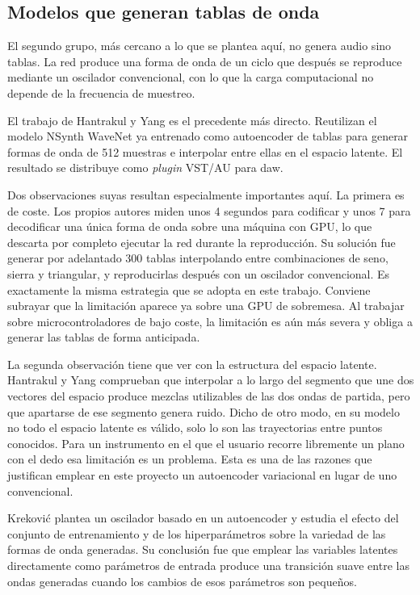 \subsection{Modelos que generan tablas de onda}

El segundo grupo, más cercano a lo que se plantea aquí, no genera audio sino
tablas. La red produce una forma de onda de un ciclo que después se reproduce
mediante un oscilador convencional, con lo que la carga computacional no 
depende de la frecuencia de muestreo.

El trabajo de Hantrakul y Yang \cite{Hantrakul2018} es el precedente más
directo. Reutilizan el modelo NSynth WaveNet ya entrenado como autoencoder de
tablas para generar formas de onda de 512 muestras e interpolar entre ellas en
el espacio latente. El resultado se distribuye como \emph{plugin} VST/AU para
\gls{daw}.

Dos observaciones suyas resultan especialmente importantes aquí. La primera es
de coste. Los propios autores miden unos 4 segundos para codificar y unos 7 para
decodificar una única forma de onda sobre una máquina con GPU, lo que descarta
por completo ejecutar la red durante la reproducción. Su solución fue generar
por adelantado 300 tablas interpolando entre combinaciones de seno, sierra y
triangular, y reproducirlas después con un oscilador convencional. Es exactamente
la misma estrategia que se adopta en este trabajo. Conviene subrayar que 
la limitación aparece ya sobre una GPU de sobremesa. Al trabajar sobre 
microcontroladores de bajo coste, la limitación es aún más severa y
obliga a generar las tablas de forma anticipada.

La segunda observación tiene que ver con la estructura del espacio latente.
Hantrakul y Yang comprueban que interpolar a lo largo del segmento que une dos
vectores del espacio produce mezclas utilizables de las dos ondas de partida,
pero que apartarse de ese segmento genera ruido. Dicho de otro modo, en su
modelo no todo el espacio latente es válido, solo lo son las trayectorias entre
puntos conocidos. Para un instrumento en el que el usuario recorre libremente un
plano con el dedo esa limitación es un problema. Esta es una de las razones que justifican
emplear en este proyecto un autoencoder variacional en lugar de uno convencional.

Kreković \cite{Krekovic2021} plantea un oscilador basado en un autoencoder y
estudia el efecto del conjunto de entrenamiento y de los hiperparámetros sobre
la variedad de las formas de onda generadas. Su conclusión fue que emplear las 
variables latentes directamente como parámetros de entrada produce una transición 
suave entre las ondas generadas cuando los cambios de esos parámetros son pequeños.


